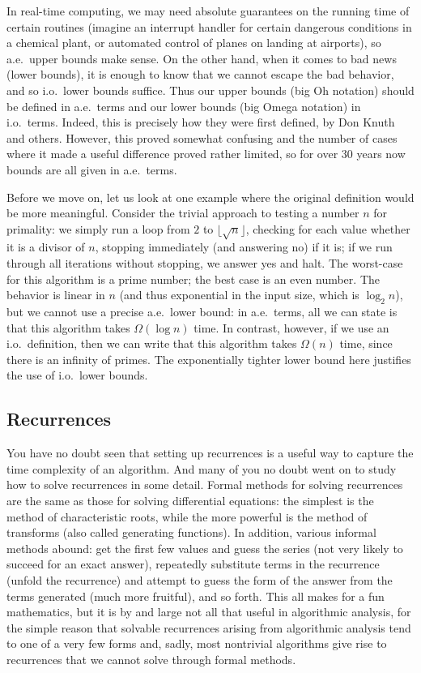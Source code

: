\documentclass{article}
\begin{document}
In real-time computing, we may need absolute guarantees on the running time
of certain routines (imagine an interrupt handler for certain dangerous
conditions in a chemical plant, or automated control of planes on landing
at airports), so a.e.\ upper bounds make sense.  On the other hand, when it
comes to bad news (lower bounds), it is enough to know that we cannot escape
the bad behavior, and so i.o.\ lower bounds suffice.  Thus our upper bounds
(big Oh notation) should be defined in a.e.\ terms and our lower bounds
(big Omega notation) in i.o.\ terms.  Indeed, this is precisely how they
were first defined, by Don Knuth and others.  However, this proved somewhat
confusing and the number of cases where it made a useful difference proved
rather limited, so for over 30 years now bounds are all given in a.e.\ terms.

Before we move on, let us look at one example where the original definition
would be more meaningful.  Consider the trivial approach to testing a number $n$
for primality: we simply run a loop from $2$ to $\lfloor\sqrt{n}\rfloor$,
checking for each value whether it is a divisor of $n$, stopping immediately
(and answering no) if it is; if we run through all iterations without
stopping, we answer yes and halt.   The worst-case for this algorithm is
a prime number; the best case is an even number.  The behavior is linear in
$n$ (and thus exponential in the input size, which is $\log_2 n$), but
we cannot use a precise a.e.\ lower bound: in a.e.\ terms, all we can state
is that this algorithm takes $\Omega(\log n)$ time.  In contrast, however,
if we use an i.o.\ definition, then we can write that this algorithm takes
$\Omega(n)$ time, since there is an infinity of primes.  The exponentially
tighter lower bound here justifies the use of i.o.\ lower bounds.

\subsection{Recurrences}
You have no doubt seen that setting up recurrences is a useful way to capture
the time complexity of an algorithm.  And many of you no doubt went on to study
how to solve recurrences in some detail.  Formal methods for solving
recurrences are the same as those for solving differential equations:
the simplest is the method of characteristic roots, while the more powerful
is the method of transforms (also called generating functions).  In addition,
various informal methods abound: get the first few values and guess the
series (not very likely to succeed for an exact answer), repeatedly
substitute terms in the recurrence (unfold the recurrence) and attempt
to guess the form of the answer from the terms generated (much more fruitful),
and so forth.  This all makes for a fun mathematics, but it is by and large
not all that useful in algorithmic analysis, for the simple reason that
solvable recurrences arising from algorithmic analysis tend to one of
a very few forms and, sadly, most nontrivial algorithms give rise to
recurrences that we cannot solve through formal methods.
\end{document}
